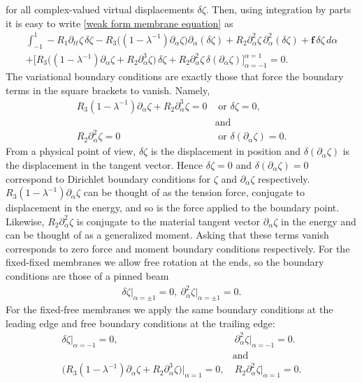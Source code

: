 \documentclass{article}[12pt]
\theoremstyle{Theorem}
\begin{document}
for all complex-valued virtual displacements $\delta\zeta$. Then, using integration by parts it is easy to write \eqref{weak form membrane equation} as
\begin{multline}
\int_{-1}^1-R_1
\partial_{tt}\zeta\, \delta\zeta 
-R_3\big((1-\lambda^{-1})\partial_\alpha\zeta\big)\partial_\alpha(\delta\zeta) + R_2\partial_\alpha^2\zeta\, \partial_\alpha^2(\delta\zeta) 
+\boldsymbol{f}\, \delta\zeta \,d\alpha \\ + \bigg[R_3\big((1-\lambda^{-1})\partial_\alpha\zeta +R_2\partial_\alpha^3\zeta\big)\,\delta\zeta + R_2\partial_\alpha^2\zeta\,\delta(\partial_\alpha\zeta)\bigg]^{\alpha=1}_{\alpha=-1}= 0.
    \label{weak form membrane equation in C2H2 equation}
\end{multline}
The variational boundary conditions are exactly those that force the boundary terms in the square brackets to vanish.
Namely,
\begin{align}
    R_3(1-\lambda^{-1})\partial_\alpha\zeta +R_2\partial_\alpha^3\zeta = 0 &\text{ or } \delta\zeta =0, \\ 
    &\text{and} \\
    R_2\partial_\alpha^2\zeta = 0 &\text{ or }  \delta(\partial_\alpha\zeta) = 0.
\end{align}
From a physical point of view, $\delta\zeta$ is the displacement in position and $\delta(\partial_\alpha\zeta)$ is the displacement in the tangent vector. Hence $\delta\zeta =0$ and $\delta(\partial_\alpha\zeta) = 0$ correspond to Dirichlet boundary conditions for $\zeta$ and $\partial_\alpha \zeta$ respectively. $R_3(1-\lambda^{-1})\partial_\alpha\zeta$ can be thought of as the tension force, 
conjugate to displacement in the energy, and so is the force applied to the boundary point. Likewise,  $R_2\partial_\alpha^2\zeta$ is conjugate to the material tangent vector $\partial_\alpha\zeta$ in the energy and can be thought of as a generalized moment. Asking that these terms vanish corresponds to zero force and moment boundary conditions respectively. For the fixed-fixed membranes we allow free rotation at the ends, so the boundary conditions are those of a pinned beam
\begin{align}
    \delta\zeta\big|_{\alpha = \pm1} = 0,\ \partial_\alpha^2\zeta\big|_{\alpha =\pm1} = 0.
\end{align}
For the fixed-free membranes we apply the same boundary conditions at the leading edge and free boundary conditions at the trailing edge: 
\begin{align}
    \delta\zeta\big|_{\alpha = -1} = 0,&\ \partial_\alpha^2\zeta\big|_{\alpha =-1} = 0. \\ &\text{and} \\
    \big(R_3(1-\lambda^{-1})\partial_\alpha\zeta +R_2\partial_\alpha^3\zeta\big) \big|_{\alpha = 1}= 0,&\ R_2\partial_\alpha^2\zeta\big|_{\alpha =1} = 0.
\end{align}
\end{document}
